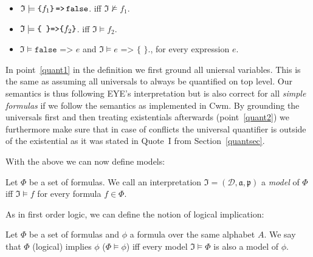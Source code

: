 \begin{definition}
\begin{enumerate}
\begin{enumerate}
\begin{itemize}
  \item \label{fal2} %
  $\mathfrak{I} \models \verb!{! f_1 \verb!}! \,\verb!=>!\, \verb!false!$. iff $\mathfrak{I} \not\models f_1$.
   \item $\mathfrak{I} \models \verb!{ }! \verb!=>! \verb!{! f_2 \verb!}!$. iff $\mathfrak{I} \models f_2$.
   \item $\mathfrak{I} \models \texttt{false => }e$ and $\mathfrak{I}\models e\texttt{ => \{~\}}.$, for every expression $e$.
   \end{itemize}
 \end{enumerate}
\end{enumerate}
  
\end{definition}

In point~\ref{quant1} in the definition we first ground all uniersal variables. This is the same as assuming all universals to always be quantified on top level. Our semantics is thus following 
EYE's interpretation but is also correct for all \emph{simple formulas} if we follow the semantics as implemented in Cwm.
By grounding the universals first and then treating existentials afterwards (point~\ref{quant2}) we furthermore make sure 
that in case of conflicts the universal quantifier is outside of the existential as it was stated in Quote~I from Section~\ref{quantsec}.


With the above we can now define models:

\begin{definition}[Model]
Let $\Phi$ be a set of \nthree formulas. We call an interpretation $\mathfrak{I}=(\mathcal{D},\mathfrak{a,p})$ a \textit{model} of $\Phi$ iff $\mathfrak{I}\models f$ for every formula $f\in \Phi$.
\end{definition}
%
As in first order logic, we can define the notion of logical implication:

\begin{definition}\label{log_impl}
Let $\Phi$ be a set of \nthree formulas  and $\phi$ a formula over the same \nthree alphabet $A$. We say that $\Phi$ (logical) implies 
$\phi$ ($\Phi \models \phi$) iff every
model $\mathfrak{I}\models \Phi$ is also a model of $\phi$.
\end{definition}

